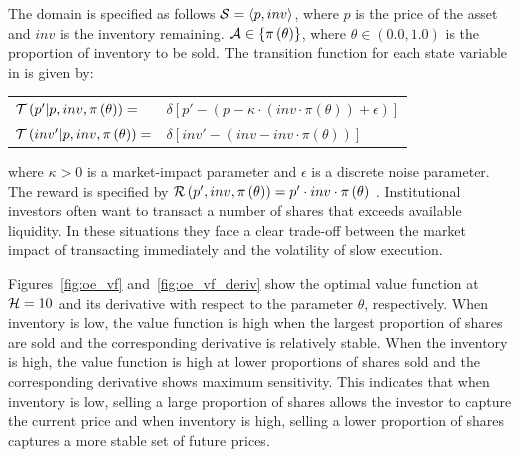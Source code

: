 The domain is specified as follows {\footnotesize $ \mathcal{S} = \left\langle p, inv \right\rangle$}, where $ p $ is the price of the asset and $ inv $ is the inventory remaining. {\footnotesize $ \mathcal{A} \in \left\lbrace \pi\left( \theta \right) \right\rbrace$}, where {\footnotesize $ \theta \in \left( 0.0, 1.0\right)$} is the proportion of inventory to be sold. The transition function {\footnotesize \Transition} for each state variable in {\footnotesize \State} is given by:
{\footnotesize 
    \abovedisplayskip=5pt
    \belowdisplayskip=0pt
    \renewcommand{\arraystretch}{1.5}
    \begin{tabular}{ll}
        $\mathcal{T}\left( p' | p, inv, \pi\left( \theta \right) \right) =$ & $ \delta \left[ p' - (p - \kappa \cdot (inv \cdot \pi\left( \theta \right)) + \epsilon) \right] $ \\
        $\mathcal{T}\left( inv' | p, inv, \pi\left( \theta \right) \right) =$ & $\delta \left[ inv' - (inv - inv \cdot \pi\left( \theta \right)) \right] $ \\
    \end{tabular}
}%
where {\footnotesize $ \kappa > 0$} is a market-impact parameter and {\footnotesize $ \epsilon $} is a discrete noise parameter. The reward is specified by {\footnotesize $ \mathcal{R}\left(p', inv, \pi\left( \theta \right) \right) = p' \cdot inv \cdot \pi\left( \theta \right)$ }. Institutional investors often want to transact a number of shares that exceeds available liquidity. In these situations they face a clear trade-off between the market impact of transacting immediately and the volatility of slow execution. 

Figures~\ref{fig:oe_vf} and~\ref{fig:oe_vf_deriv} show the optimal value function at {\footnotesize $ \mathcal{H} = 10 $} and its derivative with respect to the parameter {\footnotesize $ \theta$}, respectively. When inventory is low, the value function is high when the largest proportion of shares are sold and the corresponding derivative is relatively stable. When the inventory is high, the value function is high at lower proportions of shares sold and the corresponding derivative shows maximum sensitivity. This indicates that when inventory is low, selling a large proportion of shares allows the investor to capture the current price and when inventory is high, selling a lower proportion of shares captures a more stable set of future prices. 

